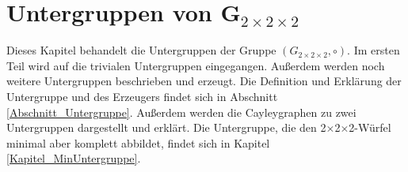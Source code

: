 \documentclass[12pt,a4paper, usenames, dvipsnames]{article}
\theoremstyle{mystyle}
\theoremstyle{definition}
\newcommand{\Gtwo}{\ensuremath{G_{2\times 2\times 2}}}
\newcommand{\Ttwo}{2$\times$2$\times$2-}
\begin{document}
%
%
%
%
%
%
%
%
%
%
%
%
%
%
%
%
%
%
%
%



%
%
%
%
%
%
%
%
%
%
%
%
%
%
%
%
%
%
%
%
\newpage

\section{Untergruppen von G$_{2\times 2\times 2}$}

\label{Kapitel_Untergruppen}

Dieses Kapitel behandelt die Untergruppen der Gruppe $(\Gtwo, \circ)$. Im ersten Teil wird auf die trivialen Untergruppen eingegangen. Außerdem werden noch weitere Untergruppen beschrieben und erzeugt.
Die Definition und Erklärung der Untergruppe und des Erzeugers findet sich in Abschnitt \ref{Abschnitt_Untergruppe}.
Außerdem werden die Cayleygraphen zu zwei Untergruppen dargestellt und erklärt. Die Untergruppe, die den \Ttwo Würfel minimal aber komplett abbildet, findet sich in Kapitel \ref{Kapitel_MinUntergruppe}.
\end{document}
